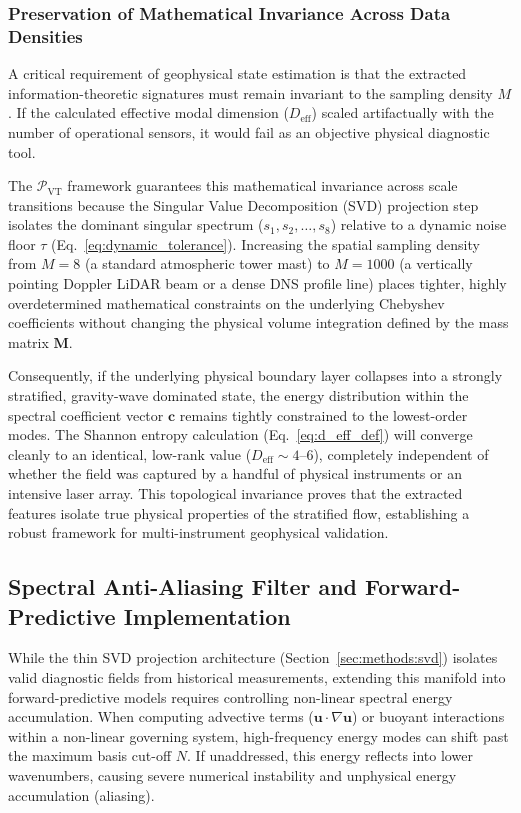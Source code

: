 \subsubsection{Preservation of Mathematical Invariance Across Data Densities}
\label{sec:extensions:invariance}

A critical requirement of geophysical state estimation is that the extracted information-theoretic signatures must remain invariant to the sampling density $M$. If the calculated effective modal dimension ($D_{\mathrm{eff}}$) scaled artifactually with the number of operational sensors, it would fail as an objective physical diagnostic tool.

The $\mathcal{P}_{\mathrm{VT}}$ framework guarantees this mathematical invariance across scale transitions because the Singular Value Decomposition (SVD) projection step isolates the dominant singular spectrum ($s_1, s_2, \dots, s_8$) relative to a dynamic noise floor $\tau$ (Eq.~\ref{eq:dynamic_tolerance}). Increasing the spatial sampling density from $M = 8$ (a standard atmospheric tower mast) to $M = 1000$ (a vertically pointing Doppler LiDAR beam or a dense DNS profile line) places tighter, highly overdetermined mathematical constraints on the underlying Chebyshev coefficients without changing the physical volume integration defined by the mass matrix $\mathbf{M}$.

Consequently, if the underlying physical boundary layer collapses into a strongly stratified, gravity-wave dominated state, the energy distribution within the spectral coefficient vector $\mathbf{c}$ remains tightly constrained to the lowest-order modes. The Shannon entropy calculation (Eq.~\ref{eq:d_eff_def}) will converge cleanly to an identical, low-rank value ($D_{\mathrm{eff}} \sim 4$--$6$), completely independent of whether the field was captured by a handful of physical instruments or an intensive laser array. This topological invariance proves that the extracted features isolate true physical properties of the stratified flow, establishing a robust framework for multi-instrument geophysical validation.

\subsection{Spectral Anti-Aliasing Filter and Forward-Predictive Implementation}
\label{sec:extensions:antialiasing}

While the thin SVD projection architecture (Section~\ref{sec:methods:svd}) isolates valid diagnostic fields from historical measurements, extending this manifold into forward-predictive models requires controlling non-linear spectral energy accumulation. When computing advective terms ($\mathbf{u} \cdot \nabla \mathbf{u}$) or buoyant interactions within a non-linear governing system, high-frequency energy modes can shift past the maximum basis cut-off $N$. If unaddressed, this energy reflects into lower wavenumbers, causing severe numerical instability and unphysical energy accumulation (aliasing).

